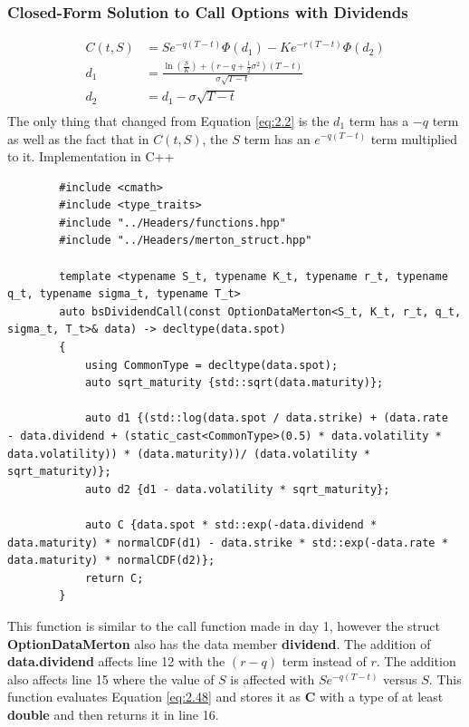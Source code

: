 \documentclass[12pt]{article}
\numberwithin{equation}{section}
\begin{document}
\subsubsection{Closed-Form Solution to Call Options with Dividends}
 \begin{equation}
	\begin{aligned}
		C(t,S) &= Se^{-q(T-t)}\Phi(d_1) - Ke^{-r(T-t)}\Phi(d_2) \\
		d_1 &= \frac{\ln(\frac{S}{K}) + (r - q + \frac{1}{2}\sigma^2)(T-t)}{\sigma\sqrt{T-t}} \\ 
		d_2 &= d_1 - \sigma\sqrt{T-t} \\ 
	\end{aligned}
	\label{eq:2.48}
\end{equation} \cite{buchanan2014ExtensionsBS}
The only thing that changed from Equation \ref{eq:2.2} is the $d_1$ term has a $-q$ term as well as the fact that in $C(t,S)$, the $S$ term has an $e^{-q(T-t)}$ term multiplied to it.
\newline \newline
Implementation in C++
\begin{listing}[ht]
	\begin{verbatim}
		#include <cmath>
		#include <type_traits>
		#include "../Headers/functions.hpp"
		#include "../Headers/merton_struct.hpp"
		
		template <typename S_t, typename K_t, typename r_t, typename q_t, typename sigma_t, typename T_t>
		auto bsDividendCall(const OptionDataMerton<S_t, K_t, r_t, q_t, sigma_t, T_t>& data) -> decltype(data.spot)
		{
			using CommonType = decltype(data.spot);
			auto sqrt_maturity {std::sqrt(data.maturity)};
			
			auto d1 {(std::log(data.spot / data.strike) + (data.rate  - data.dividend + (static_cast<CommonType>(0.5) * data.volatility * data.volatility)) * (data.maturity))/ (data.volatility * sqrt_maturity)};
			auto d2 {d1 - data.volatility * sqrt_maturity};
			
			auto C {data.spot * std::exp(-data.dividend * data.maturity) * normalCDF(d1) - data.strike * std::exp(-data.rate * data.maturity) * normalCDF(d2)};
			return C;
		}
	\end{verbatim}
	\caption{Black-76 Call using Closed Form Solution}
	\label{lst:mertoncall}
\end{listing}

This function is similar to the call function made in day 1, however the struct \textbf{OptionDataMerton} also has the data member \textbf{dividend}.  The addition of \textbf{data.dividend} affects line 12 with the $(r-q)$ term instead of $r$. The addition also affects line 15 where the value of $S$ is affected with $Se^{-q(T-t)}$ versus $S$. This function evaluates Equation \ref{eq:2.48} and stores it as \textbf{C} with a type of at least \textbf{double} and then returns it in line 16.
\end{document}
